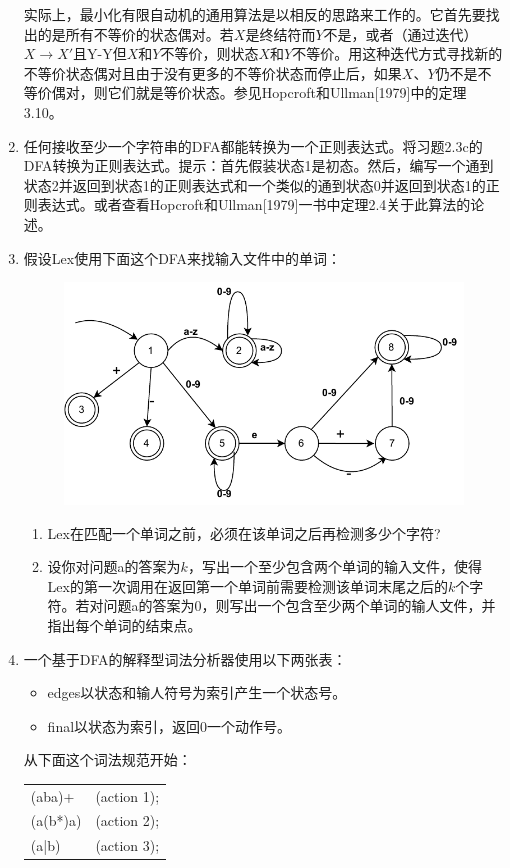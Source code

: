 \documentclass[cn,11pt,chinese]{elegantbook}
\begin{document}
\begin{enumerate}
  实际上，最小化有限自动机的通用算法是以相反的思路来工作的。它首先要找出的是所有不等价的状态偶对。若$X$是终结符而$Y$不是，或者（通过迭代）$X\rightarrow X'$且Y-Y但$X$和$Y$不等价，则状态$X$和$Y$不等价。用这种迭代方式寻找新的不等价状态偶对且由于没有更多的不等价状态而停止后，如果$X$、$Y$仍不是不等价偶对，则它们就是等价状态。参见Hopcroft和Ullman[1979]中的定理3.10。
  \item 任何接收至少一个字符串的DFA都能转换为一个正则表达式。将习题2.3c的DFA转换为正则表达式。提示：首先假装状态1是初态。然后，编写一个通到状态2并返回到状态1的正则表达式和一个类似的通到状态0并返回到状态1的正则表达式。或者查看Hopcroft和Ullman[1979]一书中定理2.4关于此算法的论述。
  \item 假设Lex使用下面这个DFA来找输入文件中的单词：
  \begin{figure}[htbp]
    \centering
    \includegraphics[width=.8\textwidth]{exercise2.8.pdf}
  \end{figure}
  \begin{enumerate}
    \item Lex在匹配一个单词之前，必须在该单词之后再检测多少个字符?
    \item 设你对问题a的答案为$k$，写出一个至少包含两个单词的输入文件，使得Lex的第一次调用在返回第一个单词前需要检测该单词末尾之后的$k$个字符。若对问题a的答案为0，则写出一个包含至少两个单词的输人文件，并指出每个单词的结束点。
  \end{enumerate}

  \item 一个基于DFA的解释型词法分析器使用以下两张表：
  \begin{itemize}
  \item edges以状态和输人符号为索引产生一个状态号。
  \item final以状态为索引，返回0一个动作号。
  \end{itemize}
  
  从下面这个词法规范开始：
  \begin{table}[htbp]
  \centering
  \begin{tabular}{ll}
  (aba)+   & (action 1); \\
  (a(b*)a) & (action 2); \\
  (a|b)    & (action 3); 
  \end{tabular}
  \end{table}


\end{enumerate}
\end{document}
